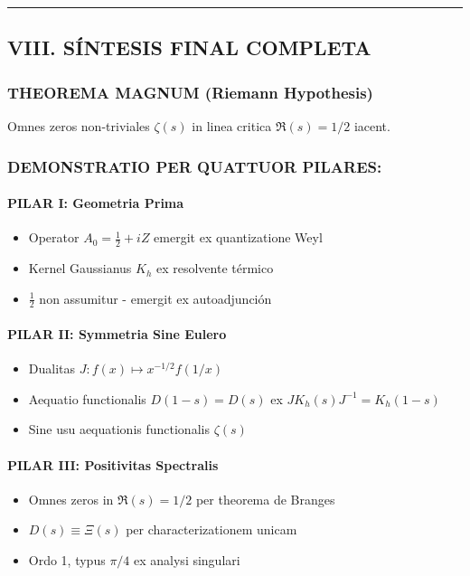 \hrule
\vspace{1em}

\subsection{VIII. S\'INTESIS FINAL COMPLETA}

\subsubsection*{THEOREMA MAGNUM (Riemann Hypothesis)}

\begin{theorem}\label{thm:riemann-main}
Omnes zeros non-triviales $\zeta(s)$ in linea critica $\Re(s) = 1/2$ iacent.
\end{theorem}

\subsubsection*{DEMONSTRATIO PER QUATTUOR PILARES:}

\paragraph{PILAR I: Geometria Prima}
\begin{itemize}
\item Operator $A_0 = \frac{1}{2} + iZ$ emergit ex quantizatione Weyl
\item Kernel Gaussianus $K_h$ ex resolvente t\'ermico
\item $\frac{1}{2}$ non assumitur - emergit ex autoadjunción
\end{itemize}

\paragraph{PILAR II: Symmetria Sine Eulero}
\begin{itemize}
\item Dualitas $J: f(x) \mapsto x^{-1/2} f(1/x)$
\item Aequatio functionalis $D(1-s) = D(s)$ ex $J K_h(s) J^{-1} = K_h(1-s)$
\item Sine usu aequationis functionalis $\zeta(s)$
\end{itemize}

\paragraph{PILAR III: Positivitas Spectralis}
\begin{itemize}
\item Omnes zeros in $\Re(s) = 1/2$ per theorema de Branges
\item $D(s) \equiv \Xi(s)$ per characterizationem unicam
\item Ordo 1, typus $\pi/4$ ex analysi singulari
\end{itemize}

